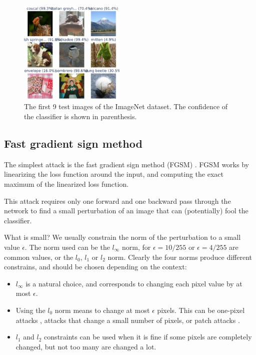\documentclass[]{scrarticle}
\begin{document}
\begin{figure}[h]
  \centering
  \includegraphics[width=0.45\textwidth]{images/sample_ImageNet.png}
  \caption{The first 9 test images of the ImageNet dataset.
    The confidence of the classifier is shown in parenthesis.}
  \label{fig:imagenet_samples}
\end{figure}


\subsection{Fast gradient sign method}
The simplest attack is the fast gradient sign method (FGSM) \cite{goodfellow2014explaining}.
FGSM works by linearizing the loss function around the input, and
computing the exact maximum of the linearized loss function.

This attack requires only one forward and one backward pass through the network
to find a small perturbation of an image that can (potentially) fool the classifier.

What is small? We usually constrain the norm of the perturbation to
a small value $\epsilon$. The norm used can be the $l_\infty$ norm,
for $\epsilon = 10 / 255$ or $\epsilon = 4 / 255$ are common values,
or the $l_0$, $l_1$ or $l_2$ norm.
Clearly the four norms produce different constrains, and should be chosen
depending on the context:
\begin{itemize}
  \item $l_\infty$ is a natural choice, and corresponds to changing each
    pixel value by at most $\epsilon$.
  \item Using the $l_0$ norm means to change at most $\epsilon$ pixels. This
    can be one-pixel attacks \cite{Su2017OnePA},
    attacks that change a small number of pixels,
    or patch attacks \cite{Brown2017AdversarialP}.
  \item $l_1$ and $l_2$ constraints can be used when it is fine if
    some pixels are completely changed, but not too many are changed
    a lot.
\end{itemize}
\end{document}
